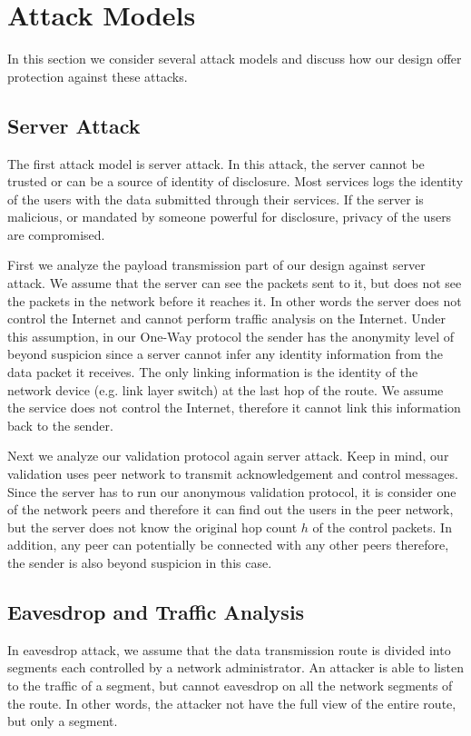 \section{Attack Models}\label{sec-attack}

In this section we consider several attack models and discuss how our
design offer protection against these attacks.

\subsection{Server Attack}
The first attack model is server attack. In this attack, the server cannot
be trusted or can be a source of identity of disclosure. Most services logs
the identity of the users with the data submitted through their services.
If the server is malicious, or mandated by someone powerful for disclosure,
privacy of the users are compromised.

First we analyze the payload transmission part of our design against
server attack. We assume that the server can see the packets sent to it,
but does not see the packets in the network before it reaches it. In
other words the server does not control the Internet and cannot perform
traffic analysis on the Internet. Under this assumption, in our One-Way
protocol the sender has the anonymity level of beyond suspicion since
a server cannot infer any identity information from the data packet it
receives. The only linking information is the identity of the network
device (e.g. link layer switch) at the last hop of the route. We assume
the service does not control the Internet, therefore it cannot link
this information back to the sender.

Next we analyze our validation protocol again server attack. Keep in mind,
our validation uses peer network to transmit acknowledgement and control
messages.
Since the server has to run our anonymous validation protocol, it is
consider one of the network peers and therefore it can
find out the users in the peer network, but the server does not know the
original hop count $h$ of the control packets. In addition, any peer can
potentially be connected with any other peers therefore, the sender is
also beyond suspicion in this case.

\subsection{Eavesdrop and Traffic Analysis}

In eavesdrop attack, we assume that the data transmission route is divided
into segments each controlled by a network administrator. An attacker is
able to listen to the traffic of a segment, but cannot eavesdrop
on all the network segments of the route. In other words, the attacker
not have the full view of the entire route, but only a segment.

